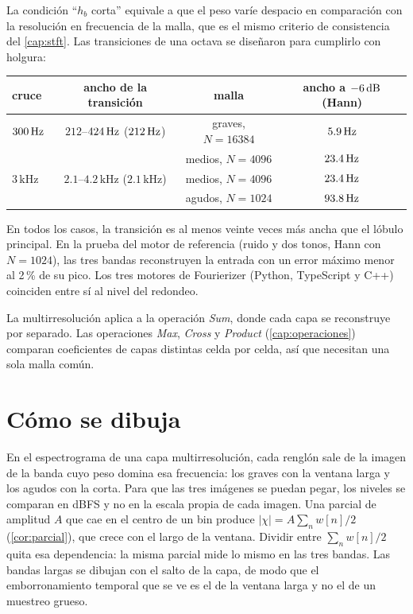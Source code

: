 La condición ``$h_b$ corta'' equivale a que el peso varíe despacio en comparación con la resolución
en frecuencia de la malla, que es el mismo criterio de consistencia del \cref{cap:stft}. Las
transiciones de una octava se diseñaron para cumplirlo con holgura:
\begin{center}\small
\begin{tabular}{lccc}
\toprule
cruce & ancho de la transición & malla & ancho a $-6\,\mathrm{dB}$ (Hann) \\
\midrule
$300\,\mathrm{Hz}$  & $212$--$424\,\mathrm{Hz}$ ($212\,\mathrm{Hz}$)          & graves, $N=16384$ & $5.9\,\mathrm{Hz}$ \\
          &                                      & medios, $N=4096$  & $23.4\,\mathrm{Hz}$ \\
$3\,\mathrm{kHz}$ & $2.1$--$4.2\,\mathrm{kHz}$ ($2.1\,\mathrm{kHz}$) & medios, $N=4096$ & $23.4\,\mathrm{Hz}$ \\
          &                                      & agudos, $N=1024$  & $93.8\,\mathrm{Hz}$ \\
\bottomrule
\end{tabular}
\end{center}
En todos los casos, la transición es al menos veinte veces más ancha que el lóbulo principal. En
la prueba del motor de referencia (ruido y dos tonos, Hann con $N=1024$), las tres bandas
reconstruyen la entrada con un error máximo menor al 2\,\% de su pico. Los tres motores de
Fourierizer (Python, TypeScript y C++) coinciden entre sí al nivel del redondeo.

\begin{observacion}
La multirresolución aplica a la operación \emph{Sum}, donde cada capa se reconstruye por separado.
Las operaciones \emph{Max}, \emph{Cross} y \emph{Product} (\cref{cap:operaciones}) comparan
coeficientes de capas distintas celda por celda, así que necesitan una sola malla común.
\end{observacion}

\section{Cómo se dibuja}

En el espectrograma de una capa multirresolución, cada renglón sale de la imagen de la banda cuyo
peso domina esa frecuencia: los graves con la ventana larga y los agudos con la corta. Para que las
tres imágenes se puedan pegar, los niveles se comparan en dBFS y no en la escala propia de cada
imagen. Una parcial de amplitud $A$ que cae en el centro de un bin produce $|\chi|=A\sum_nw[n]/2$
(\cref{cor:parcial}), que crece con el largo de la ventana. Dividir entre $\sum_nw[n]/2$ quita esa
dependencia: la misma parcial mide lo mismo en las tres bandas. Las bandas largas se dibujan con
el salto de la capa, de modo que el emborronamiento temporal que se ve es el de la ventana larga y
no el de un muestreo grueso.

